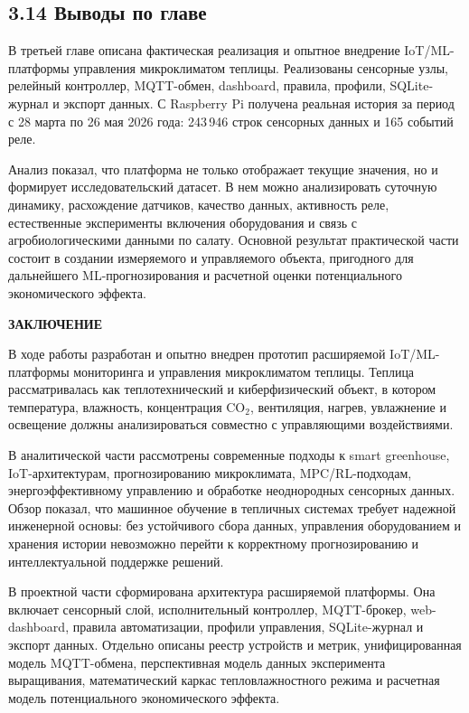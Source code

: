 \documentclass[a4paper,14pt]{extarticle}
\newcommand{\VkrStructuralSection}[1]{%
  \FloatBarrier
  \clearpage
  \phantomsection
  \addcontentsline{toc}{section}{#1}%
  \begin{center}\bfseries #1\end{center}%
  \par\nopagebreak\vspace{12pt}%
}
\begin{document}
\hypertarget{ux432ux44bux432ux43eux434ux44b-ux43fux43e-ux433ux43bux430ux432ux435-1}{%
\subsection{3.14 Выводы по
главе}\label{ux432ux44bux432ux43eux434ux44b-ux43fux43e-ux433ux43bux430ux432ux435-1}}

В третьей главе описана фактическая реализация и опытное внедрение
IoT/ML-платформы управления микроклиматом теплицы. Реализованы сенсорные
узлы, релейный контроллер, MQTT-обмен, dashboard, правила, профили,
SQLite-журнал и экспорт данных. С Raspberry Pi получена реальная история
за период с 28 марта по 26 мая 2026 года: 243\,946 строк сенсорных
данных и 165 событий реле.

Анализ показал, что платформа не только отображает текущие значения, но
и формирует исследовательский датасет. В нем можно анализировать
суточную динамику, расхождение датчиков, качество данных, активность
реле, естественные эксперименты включения оборудования и связь с
агробиологическими данными по салату. Основной результат практической
части состоит в создании измеряемого и управляемого объекта, пригодного
для дальнейшего ML-прогнозирования и расчетной оценки потенциального
экономического эффекта.

\hypertarget{ux437ux430ux43aux43bux44eux447ux435ux43dux438ux435}{%
\VkrStructuralSection{ЗАКЛЮЧЕНИЕ}\label{ux437ux430ux43aux43bux44eux447ux435ux43dux438ux435}}

В ходе работы разработан и опытно внедрен прототип расширяемой
IoT/ML-платформы мониторинга и управления микроклиматом теплицы. Теплица
рассматривалась как теплотехнический и киберфизический объект, в котором
температура, влажность, концентрация CO\(_2\), вентиляция, нагрев,
увлажнение и освещение должны анализироваться совместно с управляющими
воздействиями.

В аналитической части рассмотрены современные подходы к smart
greenhouse, IoT-архитектурам, прогнозированию микроклимата,
MPC/RL-подходам, энергоэффективному управлению и обработке неоднородных
сенсорных данных. Обзор показал, что машинное обучение в тепличных
системах требует надежной инженерной основы: без устойчивого сбора
данных, управления оборудованием и хранения истории невозможно перейти к
корректному прогнозированию и интеллектуальной поддержке решений.

В проектной части сформирована архитектура расширяемой платформы. Она
включает сенсорный слой, исполнительный контроллер, MQTT-брокер,
web-dashboard, правила автоматизации, профили управления, SQLite-журнал
и экспорт данных. Отдельно описаны реестр устройств и метрик,
унифицированная модель MQTT-обмена, перспективная модель данных
эксперимента выращивания, математический каркас тепловлажностного режима
и расчетная модель потенциального экономического эффекта.
\end{document}
